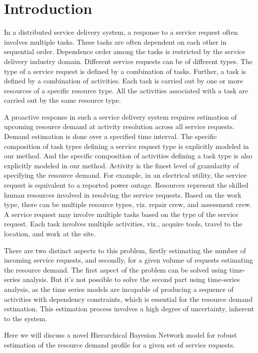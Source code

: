 \documentclass[twoside,leqno,twocolumn]{article}
\begin{document}
\section{Introduction}
\label{sec:intro}
In a distributed service delivery system, a response to a service request often involves multiple tasks. These tasks are often dependent on each other in sequential order. Dependence order among the tasks is restricted by the service delivery industry domain.  Different service requests can be of different types. The type of a service request is defined by a combination of tasks. Further, a task is defined by a combination of activities. Each task is carried out by one or more resources of a specific resource type. All the activities associated with a task are carried out by the same resource type.
\par
A proactive response in such a service delivery system requires estimation of upcoming resource demand at activity resolution across all service requests. Demand estimation is done over a specified time interval. The specific composition of task types defining a service request type is explicitly modeled in our method. And the specific composition of activities defining a task type is also explicitly modeled in our method. Activity is the finest level of granularity of specifying the resource demand. For example, in an electrical utility, the service request is equivalent to a reported power outage. Resources represent the skilled human resources involved in resolving the service requests. Based on the work type, there can be multiple resource types, viz. repair crew, and assessment crew. A service request may involve multiple tasks based on the type of the service request. Each task involves multiple activities, viz., acquire tools, travel to the location, and work at the site.
\par
There are two distinct aspects to this problem, firstly estimating the number of incoming service requests, and secondly, for a given volume of requests estimating the resource demand. The first aspect of the problem can be solved using time-series analysis. But it's not possible to solve the second part using time-series analysis, as the time series models are incapable of producing a sequence of activities with dependency constraints, which is essential for the resource demand estimation. This estimation process involves a high degree of uncertainty, inherent to the system. 
\par
Here we will discuss a novel Hierarchical Bayesian Network model for robust estimation of the resource demand profile for a given set of service requests.
\end{document}

